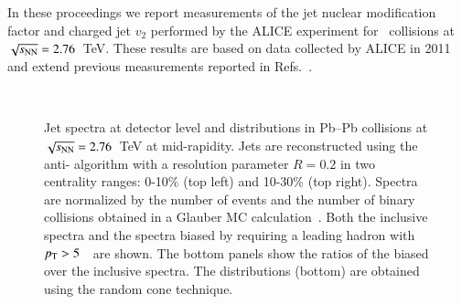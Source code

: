 \documentclass[3p,times]{simplearticle}
\begin{document}
In these proceedings we report measurements of the jet nuclear modification factor and charged jet $v_2$ performed by the ALICE experiment
for \PbPb\ collisions at $\sqrt{s_{\mathrm{NN}}}=2.76$~TeV. 
These results are based on data collected by ALICE in 2011 and extend previous measurements reported in Refs.~\cite{Aiola:2013, Reed:2013}.
%
\begin{figure}[t]
\centering
{} \quad
{} \\
\caption{Jet \pT{} spectra at detector level and \dpT{} distributions
in \mbox{Pb--Pb} collisions at $\sqrt{s_{\mathrm{NN}}}=2.76$~TeV at mid-rapidity.
Jets are reconstructed using the anti-\kt{} algorithm 
with a resolution parameter $R=0.2$ in two centrality ranges: 0-10\% (top left) and 10-30\% (top right).
Spectra are normalized by the number of events and the number of binary collisions obtained in a Glauber MC calculation~\cite{ALICE:2013b}.
Both the inclusive spectra and the spectra biased by requiring a leading hadron with $p_{\mathrm{T}}>5$~\GeVc\ are shown.
The bottom panels show the ratios of the biased over the inclusive spectra. The \dpT{} distributions (bottom) 
are obtained using the random cone technique.}
\label{fig:RawJetSpectraDeltaPt}
\end{figure}
%
\end{document}
